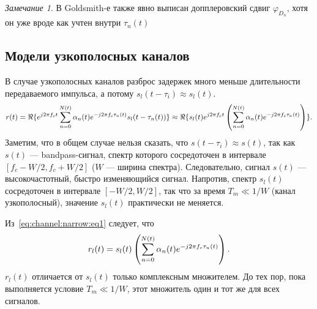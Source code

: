 \documentclass{book}
\numberwithin{theorem}{chapter}
\numberwithin{statement}{chapter}
\numberwithin{lemma}{chapter}
\theoremstyle{definition}
\numberwithin{task}{chapter}
\theoremstyle{remark}
\numberwithin{example}{chapter}
\theoremstyle{definition}
\numberwithin{definition}{chapter}
\theoremstyle{remark}
\newtheorem{note}{Замечание}
\theoremstyle{remark}
\numberwithin{lyrics}{section}
\begin{document}
\begin{note}
	В Goldsmith-е также явно выписан допплеровский сдвиг $\varphi_{D_n}$, хотя он уже вроде как учтен внутри $\tau_n(t)$
\end{note}

%
%


\subsection{Модели узкополосных каналов}
В случае узкополосных каналов разброс задержек много меньше длительности передаваемого импульса, а потому $s_l(t - \tau_i) \approx s_l(t)$. 
\begin{equation}
\label{eq:channel:narrow:eq1}
r(t) = \Re\{e^{j2\pi f_c t}\sum\limits_{n = 0}^{N(t)} \alpha_n(t) e^{-j2\pi f_c \tau_n(t)} s_l(t - \tau_n(t))\} \approx 
\Re\{s_l(t) e^{j2\pi f_c t} \left(\sum\limits_{n = 0}^{N(t)} \alpha_n(t) e^{-j2\pi f_c \tau_n(t)}\right)\}.
\end{equation}
Заметим, что в общем случае нельзя сказать, что $s(t - \tau_i) \approx s(t)$, так как $s(t)$ --- bandpass-сигнал, спектр которого сосредоточен в интервале $[f_c - W / 2, f_c + W / 2]$ ($W$ --- ширина спектра). Следовательно, сигнал $s(t)$ --- высокочастотный, быстро изменяющийся сигнал. Напротив, спектр $s_l(t)$ сосредоточен в интервале $[-W/2, W/2]$, так что за время $T_m \ll 1 / W$ (канал узкополосный), значение $s_l(t)$ практически не меняется.

Из~\eqref{eq:channel:narrow:eq1} следует, что 
$$
r_l(t) = s_l(t) \left(\sum\limits_{n = 0}^{N(t)} \alpha_n(t) e^{-j2\pi f_c \tau_n(t)}\right).
$$
$r_l(t)$ отличается от $s_l(t)$ только комплексным множителем. До тех пор, пока выполняется условие $T_m \ll 1 / W$, этот множитель один и тот же для всех сигналов. 
\end{document}

